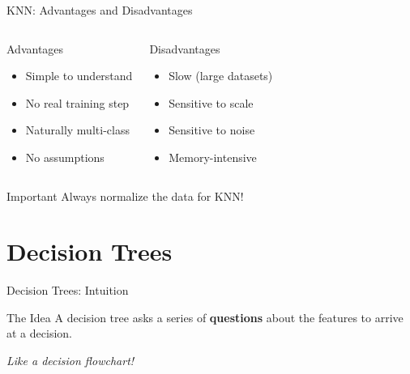 \documentclass[aspectratio=169]{beamer}
\begin{document}
\begin{frame}{KNN: Advantages and Disadvantages}
\begin{columns}[T]
\begin{block}{Advantages}
\begin{itemize}
    \item Simple to understand
    \item No real training step
    \item Naturally multi-class
    \item No assumptions
\end{itemize}
\end{block}

\begin{block}{Disadvantages}
\begin{itemize}
    \item Slow (large datasets)
    \item Sensitive to scale
    \item Sensitive to noise
    \item Memory-intensive
\end{itemize}
\end{block}
\end{columns}

\vspace{0.5cm}
\begin{alertblock}{Important}
Always normalize the data for KNN!
\end{alertblock}
\end{frame}

\section{Decision Trees}

\begin{frame}{Decision Trees: Intuition}
\begin{block}{The Idea}
A decision tree asks a series of \textbf{questions} about the features to arrive at a decision.
\end{block}

\vspace{0.3cm}
\begin{center}
\end{center}

\vspace{0.3cm}
\textit{Like a decision flowchart!}
\end{frame}
\end{document}
